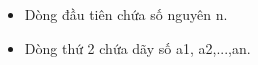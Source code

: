 \begin{itemize}
	\item     Dòng đầu tiên chứa số nguyên n.   
	\item     Dòng thứ 2 chứa dãy số a1, a2,...,an.   
\end{itemize}